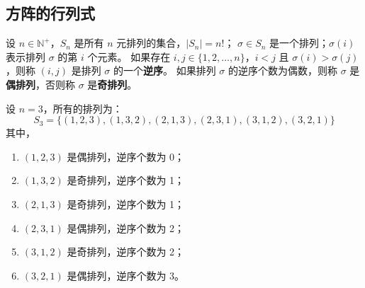 

\vspace{1em}
\subsection{方阵的行列式}

\begin{definition}[排列 Permutation]
    设 $n\in\mathbb{N}^+$，$S_n$ 是所有 $n$ 元排列的集合，$|S_n|=n!$；
    $\sigma \in S_n$ 是一个排列；$\sigma(i)$ 表示排列 $\sigma$ 的第 $i$ 个元素。
    如果存在 $i,j\in\{1,2,\ldots,n\}$，$i<j$ 且 $\sigma(i)>\sigma(j)$，则称 $(i,j)$ 是排列 $\sigma$ 的一个\textbf{逆序}。
    如果排列 $\sigma$ 的逆序个数为偶数，则称 $\sigma$ 是\textbf{偶排列}，否则称 $\sigma$ 是\textbf{奇排列}。
\end{definition}

\begin{example}
    设 $n=3$，所有的排列为：
    \[
        S_3 = \{(1,2,3),(1,3,2),(2,1,3),(2,3,1),(3,1,2),(3,2,1)\}
    \]
    其中，
    \begin{enumerate}
        \item $(1,2,3)$ 是偶排列，逆序个数为 0；
        \item $(1,3,2)$ 是奇排列，逆序个数为 1；
        \item $(2,1,3)$ 是奇排列，逆序个数为 1；
        \item $(2,3,1)$ 是偶排列，逆序个数为 2；
        \item $(3,1,2)$ 是奇排列，逆序个数为 2；
        \item $(3,2,1)$ 是偶排列，逆序个数为 3。
    \end{enumerate}
\end{example}
\vspace{1em}

